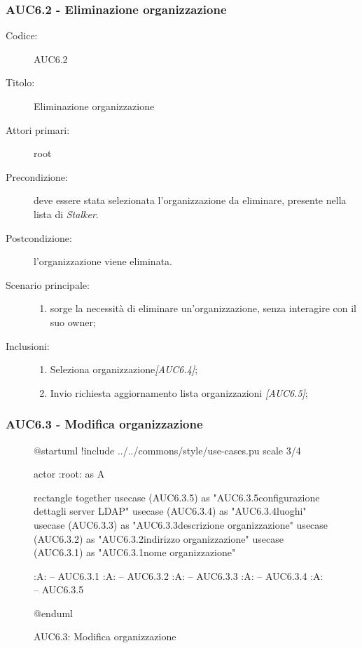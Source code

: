 \documentclass[casi-duso]{subfiles}
\begin{document}
\subsubsection{AUC6.2 - Eliminazione organizzazione}%
\label{subsub:AUC6.2}
\begin{description}
  \item[Codice:] AUC6.2
  \item[Titolo:] Eliminazione organizzazione
  \item[Attori primari:] root
  \item[Precondizione:] deve essere stata selezionata l'organizzazione da eliminare, presente nella lista di \emph{Stalker}.
  \item[Postcondizione:] l'organizzazione viene eliminata.
  \item[Scenario principale:]
  \begin{enumerate}
    \item sorge la necessità di eliminare un'organizzazione, senza interagire con il suo owner;
  \end{enumerate}
  \item[Inclusioni:]
  \begin{enumerate}
    \item Seleziona organizzazione\emph{[AUC6.4]};
    \item Invio richiesta aggiornamento lista organizzazioni \emph{[AUC6.5]};
  \end{enumerate}
\end{description}

\subsubsection{AUC6.3 - Modifica organizzazione}%
\label{subsub:AUC6.3}

\begin{figure}[h!] 
  \centering 
  \begin{plantuml}
  @startuml
  !include ../../commons/style/use-cases.pu
  scale 3/4

  actor :root: as A

  rectangle {
    together {
      usecase (AUC6.3.5) as "AUC6.3.5\nModifica configurazione dettagli server LDAP"
      usecase (AUC6.3.4) as "AUC6.3.4\nGestione luoghi"
      usecase (AUC6.3.3) as "AUC6.3.3\nModifica descrizione organizzazione"
      usecase (AUC6.3.2) as "AUC6.3.2\nModifica indirizzo organizzazione"
      usecase (AUC6.3.1) as "AUC6.3.1\nModifica nome organizzazione" 
    }
  }

  :A: -- AUC6.3.1
  :A: -- AUC6.3.2
  :A: -- AUC6.3.3
  :A: -- AUC6.3.4
  :A: -- AUC6.3.5

  @enduml
  \end{plantuml} 
  \caption{AUC6.3: Modifica organizzazione} 
  \label{fig:auc6_3} 
\end{figure}
\end{document}
